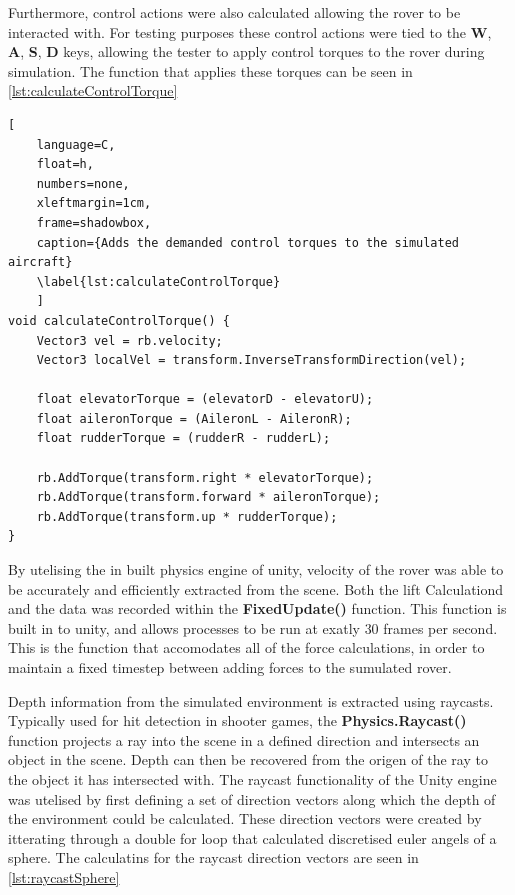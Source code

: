 \documentclass{UoNMCHA}
\numberwithin{equation}{section}
\begin{document}
Furthermore, control actions were also calculated allowing the rover to be interacted with. For testing purposes these control actions were tied to the \textbf{W}, \textbf{A}, \textbf{S}, \textbf{D} keys, allowing the tester to apply control torques to the rover during simulation. The function that applies these torques can be seen in \cref{lst:calculateControlTorque}

\begin{lstlisting}[
    language=C,
	float=h,
	numbers=none,
    xleftmargin=1cm,
    frame=shadowbox,
	caption={Adds the demanded control torques to the simulated aircraft}
	\label{lst:calculateControlTorque}
	]
void calculateControlTorque() {
	Vector3 vel = rb.velocity;
	Vector3 localVel = transform.InverseTransformDirection(vel);

	float elevatorTorque = (elevatorD - elevatorU);
	float aileronTorque = (AileronL - AileronR);
	float rudderTorque = (rudderR - rudderL);

	rb.AddTorque(transform.right * elevatorTorque);
	rb.AddTorque(transform.forward * aileronTorque);
	rb.AddTorque(transform.up * rudderTorque);
}
\end{lstlisting}

By utelising the in built physics engine of unity, velocity of the rover was able to be accurately and efficiently extracted from the scene. Both the lift Calculationd and the data was recorded within the \textbf{FixedUpdate()} function. This function is built in to unity, and allows processes to be run at exatly $30$ frames per second. This is the function that accomodates all of the force calculations, in order to maintain a fixed timestep between adding forces to the sumulated rover.

Depth information from the simulated environment is extracted using raycasts. Typically used for hit detection in shooter games, the \textbf{Physics.Raycast()} function projects a ray into the scene in a defined direction and intersects an object in the scene. Depth can then be recovered from the origen of the ray to the object it has intersected with. The raycast functionality of the Unity engine was utelised by first defining a set of direction vectors along which the depth of the environment could be calculated. These direction vectors were created by itterating through a double for loop that calculated discretised euler angels of a sphere. The calculatins for the raycast direction vectors are seen in \cref{lst:raycastSphere}
\end{document}
